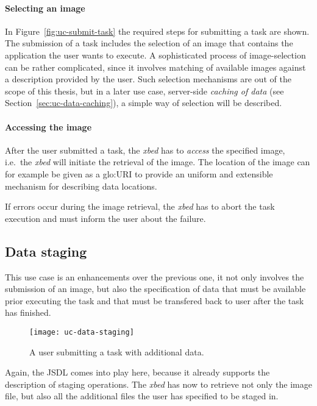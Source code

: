 \paragraph{Selecting an image}
In  Figure~\ref{fig:uc-submit-task} the  required steps  for  submitting a
task are  shown. The  submission of  a task includes  the selection  of an
image  that  contains  the  application  the user  wants  to  execute.   A
sophisticated process of image-selection  can be rather complicated, since
it involves matching of available images against a description provided by
the user. Such  selection mechanisms are out of the  scope of this thesis,
but  in  a  later  use  case,  server-side  \emph{caching  of  data}  (see
Section~\ref{sec:uc-data-caching}),  a  simple way  of  selection will  be
described.

\paragraph{Accessing the image}
After the user submitted a  task, the \emph{xbed} has to \emph{access} the
specified image,  i.e.~the \emph{xbed} will initiate the  retrieval of the
image.   The  location  of  the  image  can for  example  be  given  as  a
\gls{glo:URI}  to   provide  an  uniform  and   extensible  mechanism  for
describing data locations.

If errors occur  during the image retrieval, the  \emph{xbed} has to abort
the task execution and must inform the user about the failure.

\subsection{Data staging}
\label{sec:uc-data-staging}

This  use case  is an  enhancements  over the  previous one,  it not  only
involves the  submission of an image,  but also the  specification of data
that  must  be  available  prior  executing  the task  and  that  must  be
transfered back to user after the task has finished.

\begin{figure}[htbp]
  \centering
  \texttt{[image: uc-data-staging]}
  \caption[UC  Data  Staging]{A user  submitting  a  task with  additional
    data.}
  \label{fig:uc-data-staging}
\end{figure}

Again,  the JSDL comes  into play  here, because  it already  supports the
description of staging operations. The \emph{xbed} has now to retrieve not
only  the image  file, but  also  all the  additional files  the user  has
specified to be staged in.

